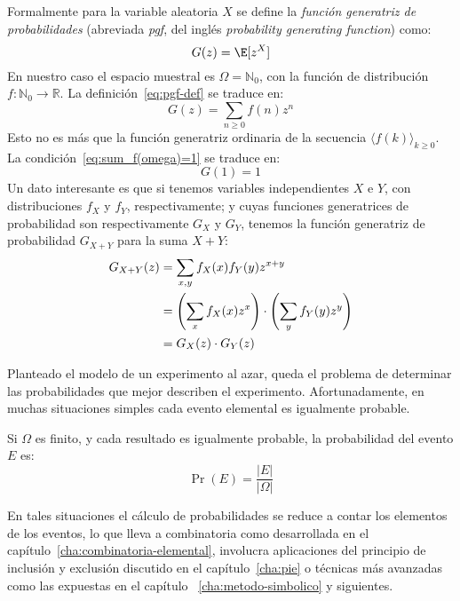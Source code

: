   Formalmente para la variable aleatoria \(X\)
  se define la \emph{función generatriz de probabilidades}
  (abreviada \emph{pgf},
  del inglés
  \emph{\foreignlanguage{english}
       {probability generating function}}) como:
  \begin{equation}
    \label{eq:pgf-def}
    G(z)
      = \E[z^X]
  \end{equation}
  En nuestro caso el espacio muestral es \(\Omega = \mathbb{N}_0\),
  con la función de distribución
  \(f \colon \mathbb{N}_0 \rightarrow \mathbb{R}\).
  La definición~\eqref{eq:pgf-def}
  se traduce en:
  \begin{equation}
    \label{eq:pgf}
    G(z)
      = \sum_{n \ge 0} f(n) z^n
  \end{equation}
  Esto no es más que la función generatriz ordinaria%
  de la secuencia \(\langle f(k) \rangle_{k \ge 0}\).
  La condición~\eqref{eq:sum_f(omega)=1}
  se traduce en:
  \begin{equation}
    \label{eq:pgf(1)=1}
    G(1)
      = 1
  \end{equation}
  Un dato interesante
  es que si tenemos variables independientes \(X\) e \(Y\),
  con distribuciones \(f_X\) y \(f_Y\),
  respectivamente;
  y cuyas funciones generatrices de probabilidad son
  respectivamente \(G_X\) y \(G_Y\),
  tenemos la función generatriz de probabilidad
  \(G_{X + Y}\) para la suma \(X + Y\):
  \begin{align}
    G_{X + Y}(z)
      &= \sum_{x, y} f_X(x) f_Y(y) z^{x + y}
	     \notag \\
      &= \left(\sum_x f_X(x) z^x\right)
	   \cdot \left(\sum_y f_Y(y) z^y\right)
	     \notag \\
      &= G_X(z) \cdot G_Y(z)
	     \label{eq:PGF-sum}
  \end{align}

  Planteado el modelo de un experimento al azar,
  queda el problema de determinar las probabilidades
  que mejor describen el experimento.
  Afortunadamente,
  en muchas situaciones simples
  cada evento elemental es igualmente probable.
  \begin{theorem}
    \label{theo:equilikely-principle}
    Si \(\Omega\) es finito,
    y cada resultado es igualmente probable,
    la probabilidad del evento \(E\)
    es:
    \begin{equation*}
      \Pr(E)
	= \frac{\lvert E \rvert}{\lvert \Omega \rvert}
    \end{equation*}
  \end{theorem}
  En tales situaciones el cálculo de probabilidades
  se reduce a contar los elementos de los eventos,
  lo que lleva a combinatoria
  como desarrollada en el capítulo~\ref{cha:combinatoria-elemental},
  involucra aplicaciones del principio de inclusión y exclusión
  discutido en el capítulo~\ref{cha:pie}
  o técnicas más avanzadas como las expuestas en el capítulo~%
    \ref{cha:metodo-simbolico} y siguientes.

